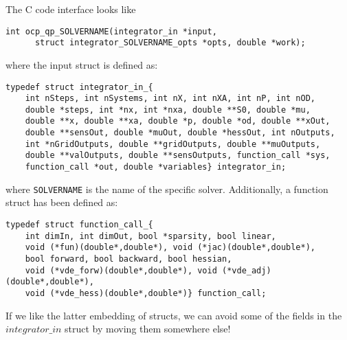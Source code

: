 \documentclass{report}
\begin{document}
The C code interface looks like
\begin{verbatim}
int ocp_qp_SOLVERNAME(integrator_in *input, 
      struct integrator_SOLVERNAME_opts *opts, double *work);
\end{verbatim}
where the input struct is defined as:
\begin{verbatim}
typedef struct integrator_in_{
    int nSteps, int nSystems, int nX, int nXA, int nP, int nOD, 
    double *steps, int *nx, int *nxa, double **S0, double *mu,
    double **x, double **xa, double *p, double *od, double **xOut, 
    double **sensOut, double *muOut, double *hessOut, int nOutputs,
    int *nGridOutputs, double **gridOutputs, double **muOutputs, 
    double **valOutputs, double **sensOutputs, function_call *sys, 
    function_call *out, double *variables} integrator_in;
\end{verbatim}
where {\tt SOLVERNAME} is the name of the specific solver. Additionally, a function struct has been defined as:
\begin{verbatim}
typedef struct function_call_{
    int dimIn, int dimOut, bool *sparsity, bool linear, 
    void (*fun)(double*,double*), void (*jac)(double*,double*), 
    bool forward, bool backward, bool hessian,
    void (*vde_forw)(double*,double*), void (*vde_adj)(double*,double*),
    void (*vde_hess)(double*,double*)} function_call;
\end{verbatim}
If we like the latter embedding of structs, we can avoid some of the fields in the $integrator\_in$ struct by moving them somewhere else!
\end{document}
